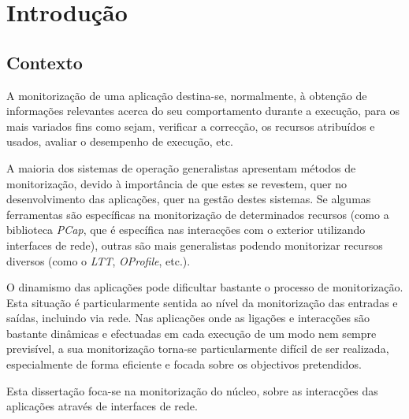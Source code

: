 \chapter{Introdução}\label{cap:introducao}

\section{Contexto}
\label{sec:intro_context}
A monitorização de uma aplicação destina-se, normalmente, à obtenção de informações relevantes acerca do seu comportamento durante a execução, para os mais variados fins como sejam, verificar a correcção, os recursos atribuídos e usados, avaliar o desempenho de execução, etc.

A maioria dos sistemas de operação generalistas apresentam métodos de monitorização, devido à importância de que estes se revestem, quer no desenvolvimento das aplicações, quer na gestão destes sistemas.
Se algumas ferramentas são específicas na monitorização de determinados recursos (como a biblioteca \textit{PCap}, que é específica nas interacções com o exterior utilizando interfaces de rede), outras são mais generalistas podendo monitorizar recursos diversos (como o \textit{LTT}, \textit{OProfile}, etc.).

O dinamismo das aplicações pode dificultar bastante o processo de monitorização.
Esta situação é particularmente sentida ao nível da monitorização das entradas e saídas, incluindo via rede.
Nas aplicações onde as ligações e interacções são bastante dinâmicas e efectuadas em cada execução de um modo nem sempre previsível, a sua monitorização torna-se particularmente difícil de ser realizada, especialmente de forma eficiente e focada sobre os objectivos pretendidos.

Esta dissertação foca-se na monitorização do núcleo, sobre as interacções das aplicações através de interfaces de rede.

